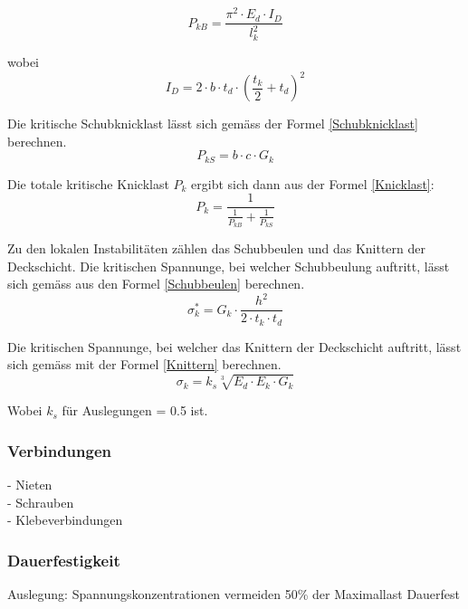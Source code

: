     \begin{equation}
      \label{Euler-Knicklast}
      P_{kB}=\frac{\pi^2 \cdot E_d \cdot I_D}{l_k^2}
    \end{equation}

    wobei
    \begin{equation}
      \label{JD}
      I_D = 2\cdot b \cdot t_d\cdot \left ( \frac{t_k}{2}+t_d \right )^2
    \end{equation}

    Die kritische Schubknicklast lässt sich gemäss der Formel \ref{Schubknicklast} berechnen.
    \begin{equation}
      \label{Schubknicklast}
      P_{kS} = b \cdot c \cdot G_k
    \end{equation}

    Die totale kritische Knicklast \(P_k\) ergibt sich dann aus der Formel \ref{Knicklast}:
    \begin{equation}
      \label{Knicklast}
      P_k=\frac{1}{\frac{1}{P_{kB}}+\frac{1}{P_{kS}}}
    \end{equation}

    Zu den lokalen Instabilitäten zählen das Schubbeulen und das Knittern der Deckschicht. Die kritischen Spannunge, bei welcher Schubbeulung auftritt, lässt sich gemäss \cite{ETH} aus den Formel \ref{Schubbeulen} berechnen.
    \begin{equation}
      \label{Schubbeulen}
      \sigma_k^* = G_k \cdot \frac{h^2}{2 \cdot t_k \cdot t_d}
    \end{equation}

    Die kritischen Spannunge, bei welcher das Knittern der Deckschicht auftritt, lässt sich gemäss \cite{ETH} mit der Formel \ref{Knittern} berechnen.
    \begin{equation}
      \label{Knittern}
      \sigma_k = k_s\sqrt[3]{E_d \cdot E_k \cdot G_k}
    \end{equation}

    Wobei \(k_s\) für Auslegungen = 0.5 ist.


  \subsubsection{Verbindungen}
    - Nieten\\
    - Schrauben\\
    - Klebeverbindungen\\

  \subsubsection{Dauerfestigkeit}
  Auslegung: Spannungskonzentrationen vermeiden
  50\% der Maximallast Dauerfest
